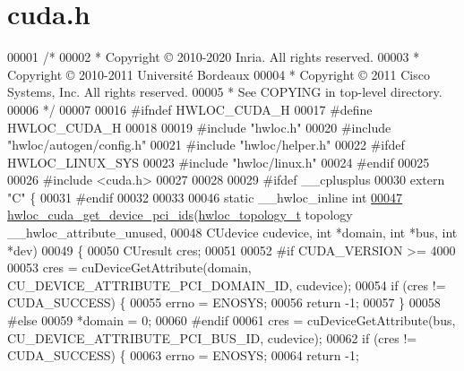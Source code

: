 \hypertarget{a00152_source}{}\section{cuda.\+h}
\label{a00152_source}

\begin{DoxyCode}
00001 \textcolor{comment}{/*}
00002 \textcolor{comment}{ * Copyright © 2010-2020 Inria.  All rights reserved.}
00003 \textcolor{comment}{ * Copyright © 2010-2011 Université Bordeaux}
00004 \textcolor{comment}{ * Copyright © 2011 Cisco Systems, Inc.  All rights reserved.}
00005 \textcolor{comment}{ * See COPYING in top-level directory.}
00006 \textcolor{comment}{ */}
00007 
00016 \textcolor{preprocessor}{#ifndef HWLOC\_CUDA\_H}
00017 \textcolor{preprocessor}{#define HWLOC\_CUDA\_H}
00018 
00019 \textcolor{preprocessor}{#include "hwloc.h"}
00020 \textcolor{preprocessor}{#include "hwloc/autogen/config.h"}
00021 \textcolor{preprocessor}{#include "hwloc/helper.h"}
00022 \textcolor{preprocessor}{#ifdef HWLOC\_LINUX\_SYS}
00023 \textcolor{preprocessor}{#include "hwloc/linux.h"}
00024 \textcolor{preprocessor}{#endif}
00025 
00026 \textcolor{preprocessor}{#include <cuda.h>}
00027 
00028 
00029 \textcolor{preprocessor}{#ifdef \_\_cplusplus}
00030 \textcolor{keyword}{extern} \textcolor{stringliteral}{"C"} \{
00031 \textcolor{preprocessor}{#endif}
00032 
00033 
00046 \textcolor{keyword}{static} \_\_hwloc\_inline \textcolor{keywordtype}{int}
\hyperlink{a00219_ga1084285e8ff8b7df91c28917637481c6}{00047} \hyperlink{a00219_ga1084285e8ff8b7df91c28917637481c6}{hwloc\_cuda\_get\_device\_pci\_ids}(\hyperlink{a00186_ga9d1e76ee15a7dee158b786c30b6a6e38}{hwloc\_topology\_t} topology 
      \_\_hwloc\_attribute\_unused,
00048                               CUdevice cudevice, \textcolor{keywordtype}{int} *domain, \textcolor{keywordtype}{int} *bus, \textcolor{keywordtype}{int} *dev)
00049 \{
00050   CUresult cres;
00051 
00052 \textcolor{preprocessor}{#if CUDA\_VERSION >= 4000}
00053   cres = cuDeviceGetAttribute(domain, CU\_DEVICE\_ATTRIBUTE\_PCI\_DOMAIN\_ID, cudevice);
00054   \textcolor{keywordflow}{if} (cres != CUDA\_SUCCESS) \{
00055     errno = ENOSYS;
00056     \textcolor{keywordflow}{return} -1;
00057   \}
00058 \textcolor{preprocessor}{#else}
00059   *domain = 0;
00060 \textcolor{preprocessor}{#endif}
00061   cres = cuDeviceGetAttribute(bus, CU\_DEVICE\_ATTRIBUTE\_PCI\_BUS\_ID, cudevice);
00062   \textcolor{keywordflow}{if} (cres != CUDA\_SUCCESS) \{
00063     errno = ENOSYS;
00064     \textcolor{keywordflow}{return} -1;

\end{DoxyCode}
